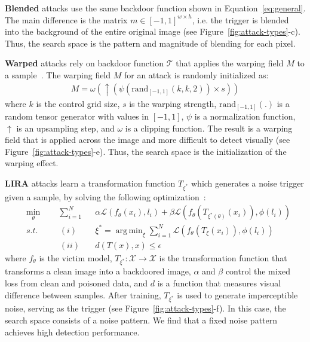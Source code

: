 \documentclass[letterpaper,twocolumn,10pt]{article}
\DeclareMathOperator*{\argmin}{arg\,min}
\begin{document}
\textbf{Blended} attacks use the same backdoor function shown in Equation~\ref{eq:general}. The main difference is the matrix $m \in \left[-1,1\right]^{w\times  h}$, i.e. the trigger is blended into the background of the entire original image (see Figure~\ref{fig:attack-types}-c). Thus, the search space is the pattern and magnitude of blending for each pixel.

\textbf{Warped} attacks rely on backdoor function $\mathcal{T}$ that applies the warping field $M$ to a sample~\cite{nguyen2021wanet}. The warping field $M$ for an attack is randomly initialized as:
\begin{equation}
\label{eq:wanet}
    \begin{split}
    M=\omega(\uparrow(\psi(\mathrm{rand}_{[-1,1]}(k,k,2))\times s))
    \end{split}
\end{equation}
where $k$ is the control grid size, $s$ is the warping strength, $\mathrm{rand}_{[-1,1]}(.)$ is a random tensor generator with values in $[-1, 1]$, $\psi$ is a normalization function, $\uparrow$ is an upsampling step, and $\omega$ is a clipping function. The result is a warping field that is applied across the image and more difficult to detect visually (see Figure~\ref{fig:attack-types}-e). Thus, the search space is the initialization of the warping effect. 

\textbf{LIRA} attacks learn a transformation function $T_{\xi^{*}}$ which generates a noise trigger given a sample, by solving the following optimization~\cite{doan2021lira}:
\begin{equation}
\label{eq:lira}
    \begin{alignedat}{3}
      & \min_{\theta}& &\sum_{i=1}^{N} & &\alpha \mathcal{L}(f_{\theta}(x_{i}),l_{i})+\beta \mathcal{L}(f_{\theta}(T_{\xi^{*}(\theta)}(x_{i})), \phi(l_{i})) \\
      & s.t. \quad & &(i) & & \xi^{*}=\argmin_{\xi} \sum_{i=1}^{N}\mathcal{L}(f_{\theta}(T_{\xi}(x_{i})),\phi (l_{i})) \\
      & & &(ii) & & d(T(x),x) \leq \epsilon
    \end{alignedat}
\end{equation}    
where $f_{\theta}$ is the victim model, $T_{\xi^{*}}: \mathcal{X} \rightarrow \mathcal{X}$ is the transformation function that transforms a clean image into a backdoored image, $\alpha$ and $\beta$ control the mixed loss from clean and poisoned data, and $d$ is a function that measures visual difference between samples. After training, $T_{\xi^{*}}$ is used to generate imperceptible noise, serving as the trigger (see Figure~\ref{fig:attack-types}-f). In this case, the search space consists of a noise pattern. We find that a fixed noise pattern achieves high detection performance.
\end{document}

